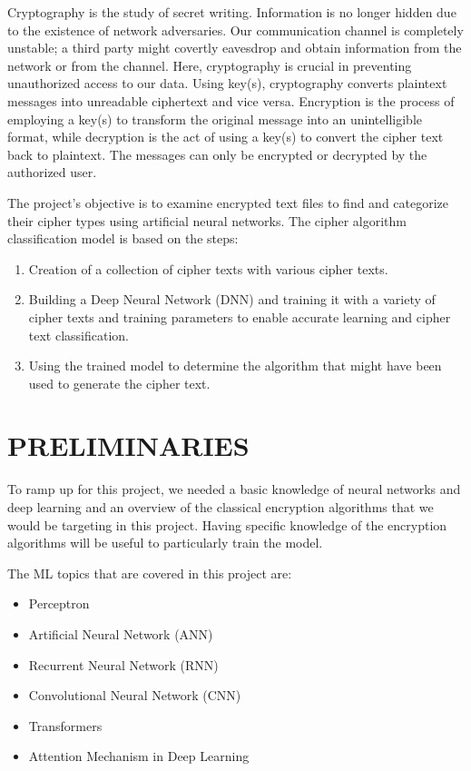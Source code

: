 \documentclass[a4paper]{article}
\begin{document}
Cryptography is the study of secret writing. Information is 
no longer hidden due to the existence of network adversaries. 
Our communication channel is completely unstable; a third 
party might covertly eavesdrop and obtain information from 
the network or from the channel. Here, cryptography is crucial 
in preventing unauthorized access to our data. Using key(s), 
cryptography converts plaintext messages into unreadable ciphertext 
and vice versa. Encryption is the process of employing a key(s) 
to transform the original message into an unintelligible format, 
while decryption is the act of using a key(s) to convert the 
cipher text back to plaintext. The messages can only be encrypted 
or decrypted by the authorized user.

The project's objective is to examine encrypted text files to 
find and categorize their cipher types using artificial neural 
networks. The cipher algorithm classification model is based 
on the steps: 
\begin{enumerate}
    \item   Creation of a collection of cipher texts with various cipher texts.
    \item   Building a Deep Neural Network (DNN) and training it with a variety of cipher texts and training parameters to enable accurate learning and cipher text classification. 
    \item   Using the trained model to determine the algorithm that might have been used to generate the cipher text. 
\end{enumerate}

\section{PRELIMINARIES}

To ramp up for this project, we needed a basic knowledge of neural networks and deep learning and an overview of the classical encryption algorithms that we would be targeting in this project. Having specific knowledge of the encryption algorithms will be useful to particularly train the model.

The ML topics that are covered in this project are:
\begin{itemize}
    \item Perceptron
    \item Artificial Neural Network (ANN)
    \item Recurrent Neural Network (RNN)
    \item Convolutional Neural Network (CNN)
    \item Transformers
    \item Attention Mechanism in Deep Learning
\end{itemize}
\end{document}
